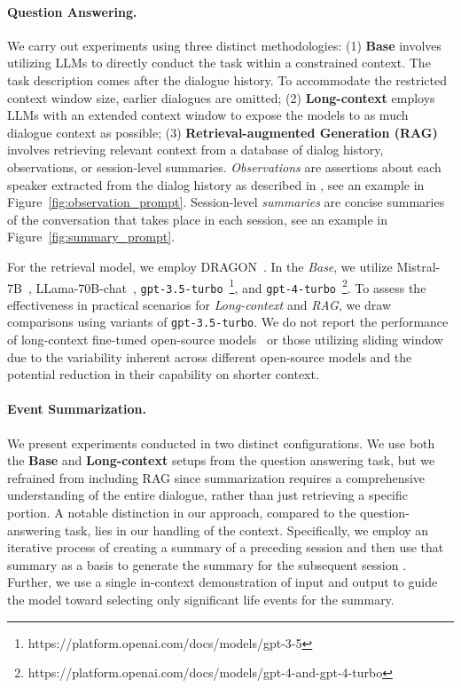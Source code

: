 \paragraph{Question Answering.}
We carry out experiments using three distinct methodologies:
(1) \textbf{Base} involves utilizing LLMs to directly conduct the task within a constrained context.
The task description comes after the dialogue history. 
To accommodate the restricted context window size, earlier dialogues are omitted; 
(2) \textbf{Long-context} employs LLMs with an extended context window to expose the models to as much dialogue context as possible;
(3) \textbf{Retrieval-augmented Generation (RAG)} involves retrieving relevant context from a database of dialog history, observations, or session-level summaries. \textit{Observations} are assertions about each speaker extracted from the dialog history as described in , see an example in Figure~\ref{fig:observation_prompt}. Session-level \textit{summaries} are concise summaries of the conversation that takes place in each session, see an example in Figure~\ref{fig:summary_prompt}.

For the retrieval model, we employ DRAGON~\cite{lin-etal-2023-train}.
In the \textit{Base}, we utilize Mistral-7B~\cite{jiang2023mistral}, LLama-70B-chat~\cite{touvron2023llama}, \texttt{gpt-3.5-turbo}~\footnote{https://platform.openai.com/docs/models/gpt-3-5}, and \texttt{gpt-4-turbo}~\footnote{https://platform.openai.com/docs/models/gpt-4-and-gpt-4-turbo}. 
To assess the effectiveness in practical scenarios for \textit{Long-context} and \textit{RAG}, we draw comparisons using variants of \texttt{gpt-3.5-turbo}.
We do not report the performance of long-context fine-tuned open-source models~\cite{chen2023longlora} or those utilizing sliding window~\cite{bertsch2024unlimiformer, dao2022flashattention} due to the variability inherent across different open-source models and the potential reduction in their capability on shorter context.

\paragraph{Event Summarization.}
We present experiments conducted in two distinct configurations.
We use both the \textbf{Base} and \textbf{Long-context} setups from the question answering task, but we refrained from including RAG since summarization requires a comprehensive understanding of the entire dialogue, rather than just retrieving a specific portion. A notable distinction in our approach, compared to the question-answering task, lies in our handling of the context. 
Specifically, we employ an iterative process of creating a summary of a preceding session and then use that summary as a basis to generate the summary for the subsequent session \cite{chang2023booookscore}. Further, we use a single in-context demonstration of input and output to guide the model toward selecting only significant life events for the summary.

